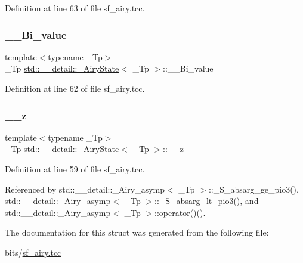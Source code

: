 Definition at line 63 of file sf\+\_\+airy.\+tcc.

\mbox{\label{structstd_1_1____detail_1_1__AiryState_a10ef7705b2b52a40502d75e62add672f}} 
\subsubsection{\texorpdfstring{\+\_\+\+\_\+\+Bi\+\_\+value}{\_\_Bi\_value}}
{\footnotesize\ttfamily template$<$typename \+\_\+\+Tp$>$ \\
\+\_\+\+Tp \hyperlink{structstd_1_1____detail_1_1__AiryState}{std\+::\+\_\+\+\_\+detail\+::\+\_\+\+Airy\+State}$<$ \+\_\+\+Tp $>$\+::\+\_\+\+\_\+\+Bi\+\_\+value}



Definition at line 62 of file sf\+\_\+airy.\+tcc.

\mbox{\label{structstd_1_1____detail_1_1__AiryState_a7606b501eba3f9b55aafa1706d7c9cc1}} 
\subsubsection{\texorpdfstring{\+\_\+\+\_\+z}{\_\_z}}
{\footnotesize\ttfamily template$<$typename \+\_\+\+Tp$>$ \\
\+\_\+\+Tp \hyperlink{structstd_1_1____detail_1_1__AiryState}{std\+::\+\_\+\+\_\+detail\+::\+\_\+\+Airy\+State}$<$ \+\_\+\+Tp $>$\+::\+\_\+\+\_\+z}



Definition at line 59 of file sf\+\_\+airy.\+tcc.



Referenced by std\+::\+\_\+\+\_\+detail\+::\+\_\+\+Airy\+\_\+asymp$<$ \+\_\+\+Tp $>$\+::\+\_\+\+S\+\_\+absarg\+\_\+ge\+\_\+pio3(), std\+::\+\_\+\+\_\+detail\+::\+\_\+\+Airy\+\_\+asymp$<$ \+\_\+\+Tp $>$\+::\+\_\+\+S\+\_\+absarg\+\_\+lt\+\_\+pio3(), and std\+::\+\_\+\+\_\+detail\+::\+\_\+\+Airy\+\_\+asymp$<$ \+\_\+\+Tp $>$\+::operator()().



The documentation for this struct was generated from the following file\+:\begin{DoxyCompactItemize}
\item 
bits/\hyperlink{sf__airy_8tcc}{sf\+\_\+airy.\+tcc}\end{DoxyCompactItemize}

